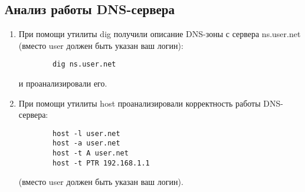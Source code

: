 \subsection{Анализ работы DNS-сервера}
\begin{enumerate}
    \item При помощи утилиты dig получили описание DNS-зоны с сервера ns.user.net (вместо user должен быть указан ваш логин):
        \begin{verbatim}
        dig ns.user.net
        \end{verbatim}
    и проанализировали его.
    \item При помощи утилиты host проанализировали корректность работы DNS-сервера:
        \begin{verbatim}
        host -l user.net
        host -a user.net
        host -t A user.net
        host -t PTR 192.168.1.1
        \end{verbatim}
(вместо user должен быть указан ваш логин).
\end{enumerate}

